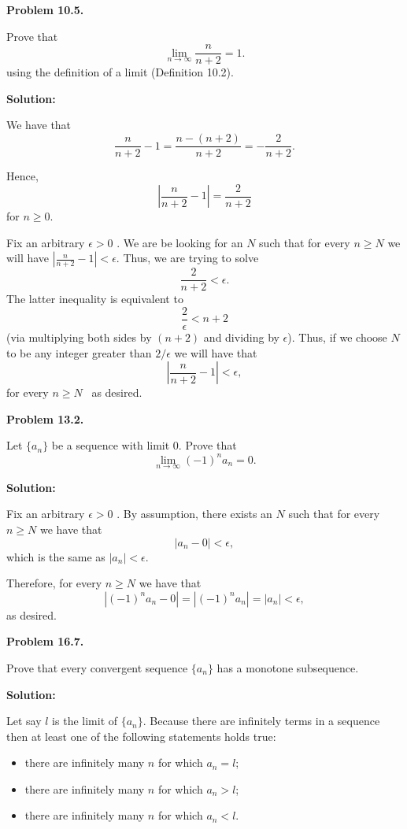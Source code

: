 \documentclass[12pt]{article}
\def\black{\color{black}}
\def\green{\color{rltgreen}}
\newcommand\bi{\begin{itemize}}
\newcommand\ei{\end{itemize}}
\renewcommand\|{\ | \ }
\newcommand\ra{\rightarrow}
\def\pb#1{{\green \bf Problem #1.}\hskip 8pt \black}
\def\sol{\textbf{Solution:}}
\def\sequence#1{$\{{#1}_n\}$}
\newcommand\e\epsilon
\newcommand\limn{\lim_{n \ra \infty}}
\newcommand\Fixaneps{Fix an arbitrary $\epsilon > 0$ }
\newcommand\thereexistsN{there exists an $N$ such that for every $n \geq N$ }
\newcommand\foreveryn{for every $n \geq N$ }
\begin{document}
\vskip 12pt

\pb {10.5}

Prove that 
\[
\limn \frac n {n + 2} = 1.
\]
using the definition of a limit (Definition 10.2).

\sol

We have that 
\[
\frac n {n + 2} - 1 = \frac {n - (n + 2)} {n + 2} = - \frac 2 {n + 2}.
\]

Hence,
\[
\left| \frac n {n + 2} - 1 \right| = \frac 2 {n + 2}
\]
for $n \geq 0$.

\Fixaneps. We are be looking for an $N$ such that \foreveryn we will have
$|\frac n {n + 2} - 1| < \e$. Thus, we are trying to solve
\[
\frac 2 {n + 2} < \e.
\]
The latter inequality is equivalent to
\[
\frac 2 \e < n + 2
\]
(via multiplying both sides by $(n + 2)$ and dividing by $\e$).
Thus, if we choose $N$ to be any integer greater than $2 / \e$ we will have
that
\[
\left| \frac n {n + 2} - 1 \right| < \epsilon,
\]
\foreveryn \ as desired.

\vskip 12pt

\pb {13.2}

Let \sequence a be a sequence with limit 0. Prove that
\[
\limn (-1)^n a_n = 0.
\]

\sol

\Fixaneps. By assumption, \thereexistsN we have that
\[
|a_n - 0| < \epsilon,
\]
which is the same as $|a_n| < \epsilon$.

Therefore, \foreveryn we have that
\[
|(-1)^n a_n - 0| = |(-1)^n a_n| = |a_n| < \epsilon,
\]
as desired.

\vskip 12pt

\pb {16.7}

Prove that every convergent sequence \sequence a has a monotone subsequence.

\sol

Let say $l$ is the limit of \sequence a. Because there are infinitely terms
in a sequence then at least one of the following statements holds true:
\bi
\item
there are infinitely many $n$ for which $a_n = l$;
\item
there are infinitely many $n$ for which $a_n > l$;
\item
there are infinitely many $n$ for which $a_n < l$.
\ei
\end{document}
